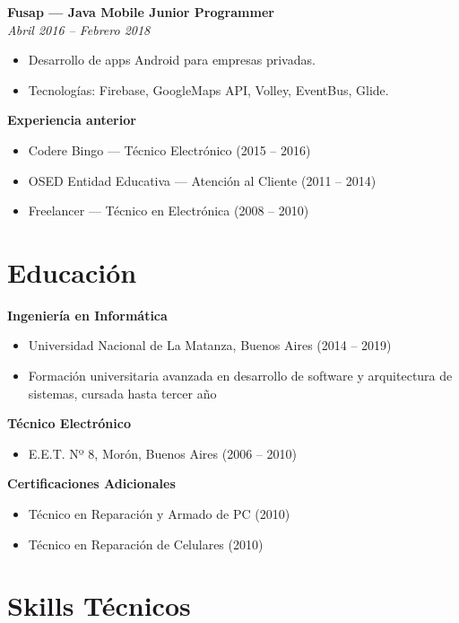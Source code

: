 \documentclass[11pt,a4paper]{article}
\newcommand{\jobtitle}[2]{
    \noindent\textbf{#1}\\
    \textit{#2}\par\vspace{0.5em}
}
\begin{document}
\jobtitle{Fusap — Java Mobile Junior Programmer}{Abril 2016 – Febrero 2018}
\begin{itemize}[leftmargin=*]
    \item Desarrollo de apps Android para empresas privadas.
    \item Tecnologías: Firebase, GoogleMaps API, Volley, EventBus, Glide.
\end{itemize}

\noindent\textbf{Experiencia anterior}\par\vspace{0.5em}
\begin{itemize}[leftmargin=*]
    \item Codere Bingo — Técnico Electrónico (2015 – 2016)
    \item OSED Entidad Educativa — Atención al Cliente (2011 – 2014)
    \item Freelancer — Técnico en Electrónica (2008 – 2010)
\end{itemize}

\section{Educación}

\textbf{Ingeniería en Informática}
\begin{itemize}[leftmargin=*]
    \item Universidad Nacional de La Matanza, Buenos Aires (2014 – 2019)
    \item Formación universitaria avanzada en desarrollo de software y arquitectura de sistemas, cursada hasta tercer año
\end{itemize}

\textbf{Técnico Electrónico}
\begin{itemize}[leftmargin=*]
    \item E.E.T. Nº 8, Morón, Buenos Aires (2006 – 2010)
\end{itemize}

\textbf{Certificaciones Adicionales}
\begin{itemize}[leftmargin=*]
    \item Técnico en Reparación y Armado de PC (2010)
    \item Técnico en Reparación de Celulares (2010)
\end{itemize}

\section{Skills Técnicos}
\end{document}
